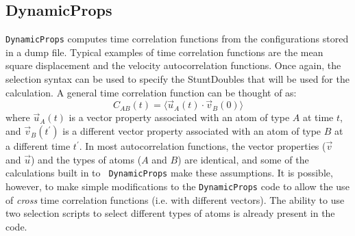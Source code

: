 \documentclass[letterpaper]{report}
\begin{document}
\subsection{\label{section:DynamicProps}DynamicProps}

{\tt DynamicProps} computes time correlation functions from the
configurations stored in a dump file.  Typical examples of time
correlation functions are the mean square displacement and the
velocity autocorrelation functions.   Once again, the selection syntax
can be used to specify the StuntDoubles that will be used for the
calculation.  A general time correlation function can be thought of
as:
\begin{equation}
C_{AB}(t) = \langle \vec{u}_A(t) \cdot \vec{v}_B(0) \rangle
\end{equation}
where $\vec{u}_A(t)$ is a vector property associated with an atom of
type $A$ at time $t$, and $\vec{v}_B(t^{\prime})$ is a different
vector property associated with an atom of type $B$ at a different
time $t^{\prime}$.  In most autocorrelation functions, the vector
properties ($\vec{v}$ and $\vec{u}$) and the types of atoms ($A$ and
$B$) are identical, and some of the calculations built in to {\tt
  DynamicProps} make these assumptions. It is possible, however, to
make simple modifications to the {\tt DynamicProps} code to allow the
use of {\it cross} time correlation functions (i.e. with different
vectors).  The ability to use two selection scripts to select
different types of atoms is already present in the code.
\end{document}
